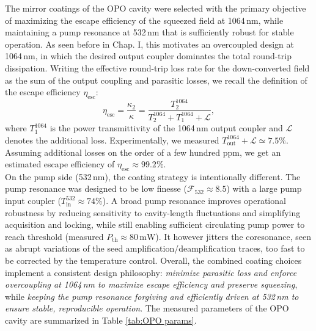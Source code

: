 The mirror coatings of the OPO cavity were selected with the primary objective of maximizing the escape efficiency of the squeezed field at 1064\,nm, while maintaining a pump resonance at 532\,nm that is sufficiently robust for stable operation. As seen before in Chap. I, this motivates an overcoupled design at 1064\,nm, in which the desired output coupler dominates the total round-trip dissipation. Writing the effective round-trip loss rate for the down-converted field as the sum of the output coupling and parasitic losses, we recall the definition of the escape efficiency $\eta_{\mathrm{esc}}$:
\begin{equation*}
\eta_{\mathrm{esc}}
= \dfrac{\kappa_{2}}{\kappa} = \frac{T^{1064}_{2}}{T^{1064}_{2} + T^{1064}_{1} + \mathcal{L}},
\label{eq:eta_esc_def}
\end{equation*}
where $T^{1064}_{1}$ is the power transmittivity of the 1064\,nm output coupler and $\mathcal{L}$ denotes the additional loss. Experimentally, we measured $T^{1064}_{\mathrm{out}} + \mathcal{L} \simeq 7.5\%$. Assuming additional losses on the order of a few hundred ppm, we get an estimated escape efficiency of $\eta_{\mathrm{esc}} \approx 99.2\%$. \\ 

On the pump side (532\,nm), the coating strategy is intentionally different. The pump resonance was designed to be low finesse ($\mathcal{F}_{532}\approx 8.5$) with a large pump input coupler ($T^{532}_{\mathrm{in}}\approx 74\%$). A broad pump resonance improves operational robustness by reducing sensitivity to cavity-length fluctuations and simplifying acquisition and locking, while still enabling sufficient circulating pump power to reach threshold (measured $P_{\mathrm{th}}\approx 80\,\mathrm{mW}$). It however jitters the coresonance, seen as abrupt variations of the seed amplification/deamplification traces, too fast to be corrected by the temperature control. Overall, the combined coating choices implement a consistent design philosophy: \textit{minimize parasitic loss and enforce overcoupling at 1064\,nm to maximize escape efficiency and preserve squeezing}, while \textit{keeping the pump resonance forgiving and efficiently driven at 532\,nm to ensure stable, reproducible operation}. The measured parameters of the OPO cavity are summarized in Table \ref{tab:OPO params}. \\

